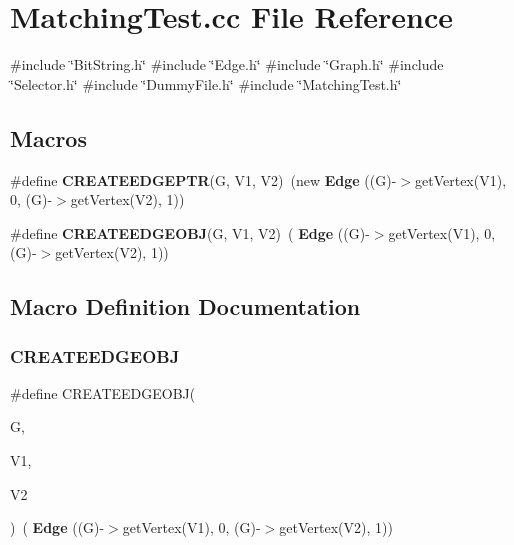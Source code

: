 \section{Matching\+Test.\+cc File Reference}
\label{MatchingTest_8cc}
{\ttfamily \#include \char`\"{}Bit\+String.\+h\char`\"{}}\newline
{\ttfamily \#include \char`\"{}Edge.\+h\char`\"{}}\newline
{\ttfamily \#include \char`\"{}Graph.\+h\char`\"{}}\newline
{\ttfamily \#include \char`\"{}Selector.\+h\char`\"{}}\newline
{\ttfamily \#include \char`\"{}Dummy\+File.\+h\char`\"{}}\newline
{\ttfamily \#include \char`\"{}Matching\+Test.\+h\char`\"{}}\newline
\subsection*{Macros}
\begin{DoxyCompactItemize}
\item 
\#define \textbf{ C\+R\+E\+A\+T\+E\+E\+D\+G\+E\+P\+TR}(G,  V1,  V2)~(new \textbf{ Edge} ((G)-\/$>$get\+Vertex(V1), 0, (G)-\/$>$get\+Vertex(V2), 1))
\item 
\#define \textbf{ C\+R\+E\+A\+T\+E\+E\+D\+G\+E\+O\+BJ}(G,  V1,  V2)~(\textbf{ Edge} ((G)-\/$>$get\+Vertex(V1), 0, (G)-\/$>$get\+Vertex(V2), 1))
\end{DoxyCompactItemize}


\subsection{Macro Definition Documentation}
\mbox{\label{MatchingTest_8cc_af45ac1f9c66a4635ba0d93ad8173b189}} 
\subsubsection{C\+R\+E\+A\+T\+E\+E\+D\+G\+E\+O\+BJ}
{\footnotesize\ttfamily \#define C\+R\+E\+A\+T\+E\+E\+D\+G\+E\+O\+BJ(\begin{DoxyParamCaption}\item[{}]{G,  }\item[{}]{V1,  }\item[{}]{V2 }\end{DoxyParamCaption})~(\textbf{ Edge} ((G)-\/$>$get\+Vertex(V1), 0, (G)-\/$>$get\+Vertex(V2), 1))}

